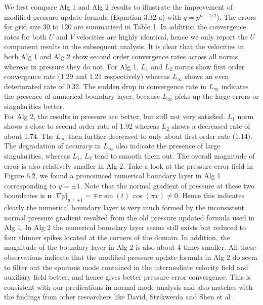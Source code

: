 We first compare Alg 1 and Alg 2 results to illustrate the improvement of modified pressure update formula (Equation 3.32 a) with $q = p^{n-1/2}$). The errors for grid size 30 to 120 are summarised in Table 1. In addition the convergence rates for both $U$ and $V$ velocities are highly identical, hence we only report the $U$ component results in the subsequent analysis. It is clear that the velocities in both Alg 1 and Alg 2 show second order convergence rates across all norms whereas in pressure they do not. For Alg 1, $L_1$ and $L_2$ norms show first order convergence rate (1.29 and 1.21 respectively) whereas $L_\infty$ shows an even deteriorated rate of 0.32. The sudden drop in convergence rate in $L_\infty$ indicates the presence of numerical boundary layer, because $L_\infty$ picks up the large errors or singularities better. \\
   For Alg 2, the results in pressure are better, but still not very satisfied. $L_1$ norm shows a close to second order rate of 1.92 whereas $L_2$ shows a decreased rate of about 1.74. The $L_\infty$ then further decreased to only about first order rate (1.14). The degradation of accuracy in $L_\infty$ also indicate the presence of large singularities, whereas $L_1,\,L_2$ tend to smooth them out. The overall magnitude of error is also relatively smaller in Alg 2. Take a look at the pressure error field in Figure 6.2, we found a pronounced numerical boundary layer in Alg 1 corresponding to $y = \pm 1$. Note that the normal gradient of pressure at these two boundaries is $\textbf{n}\cdot \nabla p |_{y = \pm 1} = \mp \pi \sin(t)\,\cos(\pi x) \neq 0$. Hence this indicates clearly the numerical boundary layer is very much formed by the inconsistent normal pressure gradient resulted from the old pressure updated formula used in Alg 1. In Alg 2 the numerical boundary layer seems still exists but reduced to four thinner spikes located at the corners of the domain. In addition, the magnitude of the boundary layer in Alg 2 is also about 4 times smaller. All these observations indicate that the modified pressure update formula in Alg 2 do seem to filter out the spurious mode contained in the intermediate velocity field and auxiliary field better, and hence gives better pressure error convergence. This is consistent with our predications in normal mode analysis and also matches with the findings from other researchers like David, Strikwerda and Shen et al \cite{brown2001accurate, strikwerda1999accuracy, guermond2006overview, guermond2004error}.\\


